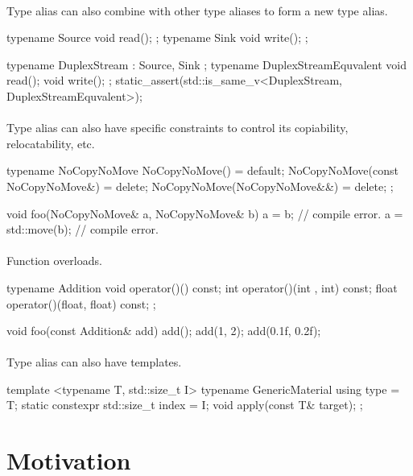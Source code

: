 \documentclass{article}
\begin{document}
\paragraph{}
Type alias can also combine with other type aliases to form a new type alias.
\begin{codeblock}
typename Source{ void read(); };
typename Sink{ void write(); };

typename DuplexStream : Source, Sink {};
typename DuplexStreamEquvalent {
  void read();
  void write();
};
static_assert(std::is_same_v<DuplexStream, DuplexStreamEquvalent>);
\end{codeblock}

\paragraph{}
Type alias can also have specific constraints to control its copiability, relocatability, etc.
\begin{codeblock}
typename NoCopyNoMove {
  NoCopyNoMove() = default;
  NoCopyNoMove(const NoCopyNoMove&) = delete;
  NoCopyNoMove(NoCopyNoMove&&) = delete;
};

void foo(NoCopyNoMove& a, NoCopyNoMove& b) {
  a = b; // compile error.
  a = std::move(b); // compile error.
}
\end{codeblock}

\paragraph{}
Function overloads.

\begin{codeblock}
typename Addition {
  void operator()() const;
  int operator()(int , int) const;
  float operator()(float, float) const;
};

void foo(const Addition& add) {
  add();
  add(1, 2);
  add(0.1f, 0.2f);
}
\end{codeblock}

\paragraph{}
Type alias can also have templates.
\begin{codeblock}
template <typename T, std::size_t I>
typename GenericMaterial {
  using type = T;
  static constexpr std::size_t index = I;
  void apply(const T& target);
};
\end{codeblock}

\section{Motivation}
\end{document}
